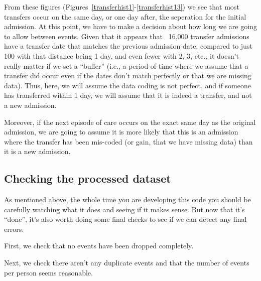 \documentclass[11pt]{article}
\begin{document}
From these figures (Figures~\ref{transferhist1}-\ref{transferhist13}) we see that most 
transfers occur on the same day, or one day after, the seperation for the 
initial admission. At this point, we have to make a decision
about how long we are going to allow between events. Given that 
it appears that ~16,000 transfer admissions have a transfer date that
matches the previous admission date, compared to just 100 with that distance being
1 day, and even fewer with 2, 3, etc., it doesn't really matter if we set a ``buffer''
(i.e., a period of time where we assume that a transfer did occur even if the
dates don't match perfectly or that we are missing data). Thus, here, we will assume the data coding is not perfect, 
and if someone has transferred within 1 day, we will assume that it is indeed a transfer, 
and not a new admission. 

Moreover, if the next episode of care occurs on the exact same day as the original
admission, we are going to assume it is more likely that 
this is an admission where the transfer has been mis-coded (or gain, that we have missing data)
than it is a new admission.

\color{Blue4}
\begin{stlog}\end{stlog}
\color{black}

\clearpage
\subsection{Checking the processed dataset}

As mentioned above, the whole time you are developing this code
you should be carefully watching what it does and seeing if it makes sense. 
But now that it's ``done'', it's also worth doing some final checks to see if we
can detect any final errors. 

First, we check that no events have been dropped completely.

\color{Blue4}
\begin{stlog}\end{stlog}
\begin{stlog}\end{stlog}
\color{black}

Next, we check there aren't any duplicate events
and that the number of events per person seems reasonable. 

\color{Blue4}
\begin{stlog}\end{stlog}
\color{black}
\end{document}
